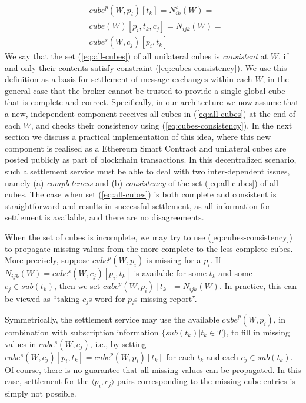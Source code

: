 \documentclass[chi_draft]{sigchi}
\begin{document}
{\begin{equation}\label{eq:cubes-consistency}
\begin{split}
& \mathit{cube}^p(W, p_i)[t_k] = N^s_{ik}(W) = \\
& \mathit{cube}(W)[p_i, t_k, c_j]  = N_{ijk}(W) = \\
& \mathit{cube^s}(W, c_j)[p_i, t_k]
\end{split}
\end{equation}
We say that the set (\ref{eq:all-cubes}) of all unilateral cubes is \textit{consistent} at $W$, if and only their contents satisfy constraint (\ref{eq:cubes-consistency}).
We use this definition as a basis for settlement of message exchanges within each $W$, in the general case that the broker cannot be trusted to provide a single global cube that is complete and correct.
%
Specifically, in our architecture we  now assume that a new, independent component receives all cubes in (\ref{eq:all-cubes}) at the end of each $W$, and checks their consistency using (\ref{eq:cubes-consistency}). 
In the next section we discuss a practical implementation of this idea, where this new component is realised as a Ethereum Smart Contract and unilateral cubes are posted publicly as part of blockchain transactions.
%
In this decentralized scenario, such a settlement service must be able to deal with two inter-dependent issues, namely (a) \textit{completeness} and (b) \textit{consistency} of the set (\ref{eq:all-cubes}) of all cubes.
%
The case when set (\ref{eq:all-cubes}) is both complete and consistent is straightforward and results in successful settlement, as all information for settlement is available, and there are no disagreements.

When the set of cubes is incomplete, we may try to use (\ref{eq:cubes-consistency}) to propagate missing values from the more complete to the less complete cubes. 
More precisely, suppose $ \mathit{cube}^p(W, p_i) $ is missing for a $p_i$.
If $ N_{ijk}(W) = \mathit{cube^s}(W, c_j)[p_i, t_k] $ is available for some $t_k$ and some $ c_j \in \mathit{sub}(t_k) $, then we set $  \mathit{cube}^p(W, p_i)[t_k]=  N_{ijk}(W) $.
In practice, this can be viewed as ``taking $ c_j $s word for $p_i$s missing report''.

Symmetrically, the settlement service may use the available $ \mathit{cube}^p(W, p_i)$, in combination with subscription information $ \{\mathit{sub}(t_k) | t_k \in T \}$, to fill in missing values in 
$  \mathit{cube^s}(W, c_j)  $, i.e., by setting 
$ \mathit{cube^s}(W, c_j)[p_i, t_k]  =  \mathit{cube}^p(W, p_i)[t_k]$ for each $t_k$ and each $c_j \in \mathit{sub}(t_k)$.
%
Of course, there is no guarantee that all missing values can be propagated. 
In this case, settlement for the $\langle p_i, c_j \rangle$ pairs corresponding to the missing cube entries is simply not possible.

}
\end{document}
